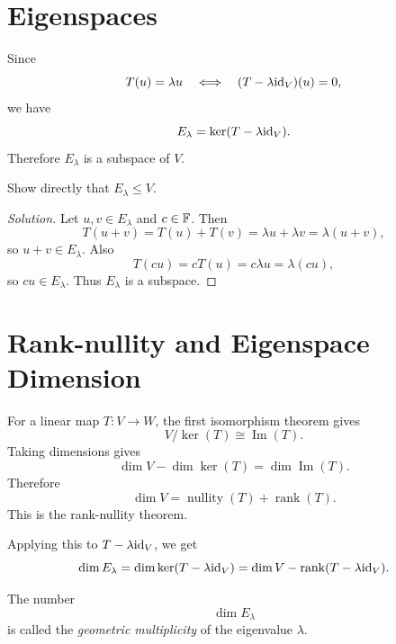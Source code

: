 \documentclass[11pt,openany]{article}
\begin{document}

\section*{Eigenspaces}
\begin{remark}
Since
\[
T(u)=\lambda u
\quad\Longleftrightarrow\quad
(T-\lambda\textnormal{id}_V)(u)=0,
\]
we have
\[
E_{\lambda}=\ker(T-\lambda\textnormal{id}_V).
\]
Therefore $E_{\lambda}$ is a subspace of $V$.
\end{remark}

\medskip
\begin{exercise}
	Show directly that $E_{\lambda}\leq V$.
\end{exercise}

\begin{proof}[Solution]
	Let $u,v\in E_{\lambda}$ and $c\in\mathbb{F}$.  Then
	\[
	T(u+v)=T(u)+T(v)=\lambda u+\lambda v=\lambda(u+v),
	\]
	so $u+v\in E_{\lambda}$.  Also
	\[
	T(cu)=cT(u)=c\lambda u=\lambda(cu),
	\]
	so $cu\in E_{\lambda}$.  Thus $E_{\lambda}$ is a subspace.
\end{proof}

\section*{Rank-nullity and Eigenspace Dimension}
For a linear map $T:V\to W$, the first isomorphism theorem gives
\[
V/\ker(T)\cong \operatorname{Im}(T).
\]
Taking dimensions gives
\[
\dim V-\dim\ker(T)=\dim\operatorname{Im}(T).
\]
Therefore
\[
\dim V=\operatorname{nullity}(T)+\operatorname{rank}(T).
\]
This is the rank-nullity theorem.

Applying this to $T-\lambda\textnormal{id}_V$, we get
\[
\dim E_{\lambda}
=\dim\ker(T-\lambda\textnormal{id}_V)
=\dim V-\operatorname{rank}(T-\lambda\textnormal{id}_V).
\]

The number
\[
\dim E_{\lambda}
\]
is called the \emph{geometric multiplicity} of the eigenvalue $\lambda$.
\end{document}
